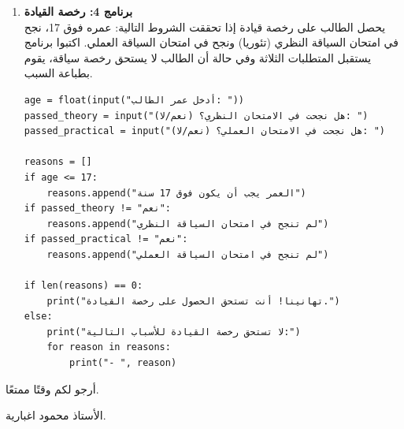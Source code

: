 \documentclass[14pt]{extarticle}
\begin{document}
\begin{enumerate}[itemsep=3em]
\begin{boxSolution}
\begin{english}
\begin{verbatim}
if height >= 130 and age >= 13:
    print("بإمكانك الدخول لقطار الجبال")
\end{verbatim}
\end{english}
\end{boxSolution}
\fi

\item \textbf{برنامج 4: رخصة القيادة} \\
يحصل الطالب على رخصة قيادة إذا تحققت الشروط التالية: عمره فوق 17، نجح في امتحان السياقة النظري (تئوريا) ونجح في امتحان السياقة العملي. اكتبوا برنامج يستقبل المتطلبات الثلاثة وفي حالة أن الطالب لا يستحق رخصة سياقة، يقوم بطباعة السبب.

\ifwithsols
\begin{boxSolution}
\begin{english}
\begin{verbatim}
age = float(input("أدخل عمر الطالب: "))
passed_theory = input("هل نجحت في الامتحان النظري؟ (نعم/لا): ")
passed_practical = input("هل نجحت في الامتحان العملي؟ (نعم/لا): ")

reasons = []
if age <= 17:
    reasons.append("العمر يجب أن يكون فوق 17 سنة")
if passed_theory != "نعم":
    reasons.append("لم تنجح في امتحان السياقة النظري")
if passed_practical != "نعم":
    reasons.append("لم تنجح في امتحان السياقة العملي")

if len(reasons) == 0:
    print("تهانينا! أنت تستحق الحصول على رخصة القيادة.")
else:
    print("لا تستحق رخصة القيادة للأسباب التالية:")
    for reason in reasons:
        print("- ", reason)
\end{verbatim}
\end{english}
\end{boxSolution}
\fi

\end{enumerate}

\vspace{1cm}
\begin{flushleft}
أرجو لكم وقتًا ممتعًا.

الأستاذ محمود اغبارية.
\end{flushleft}
\end{document}
